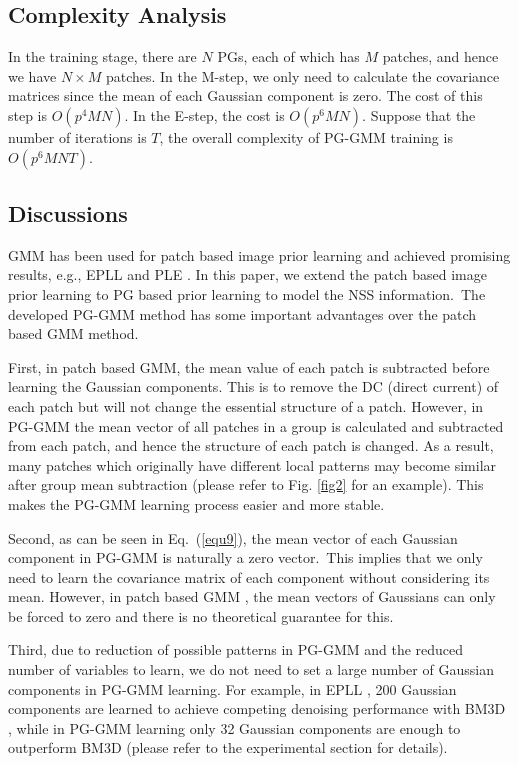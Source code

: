 \subsection{Complexity Analysis}
In the training stage, there are $N$ PGs, each of which has $M$ patches, and hence we have $N\times M$ patches. In the M-step, we only need to calculate the covariance matrices since the mean of each Gaussian component is zero. The cost of this step is $O(p^{4}MN)$. In the E-step, the cost is $O(p^{6}MN)$. Suppose that the number of iterations is $T$, the overall complexity of PG-GMM training is $O(p^{6}MNT)$.
\subsection{Discussions}
GMM has been used for patch based image prior learning and achieved promising results, e.g., EPLL \cite{epll} and PLE \cite{ple}. In this paper, we extend the patch based image prior learning to PG based prior learning to model the NSS information.\ The developed PG-GMM method has some important advantages over the patch based GMM method.

First, in patch based GMM, the mean value of each patch is subtracted before learning the Gaussian components. This is to remove the DC (direct current) of each patch but will not change the essential structure of a patch. However, in PG-GMM the mean vector of all patches in a group is calculated and subtracted from each patch, and hence the structure of each patch is changed. As a result, many patches which originally have different local patterns may become similar after group mean subtraction (please refer to Fig. \ref{fig2} for an example). This makes the PG-GMM learning process easier and more stable. 

Second, as can be seen in Eq.\ (\ref{equ9}), the mean vector of each Gaussian component in PG-GMM is naturally a zero vector.\ This implies that we only need to learn the covariance matrix of each component without considering its mean. However, in patch based GMM \cite{epll}, the mean vectors of Gaussians can only be forced to zero and there is no theoretical guarantee for this.

Third, due to reduction of possible patterns in PG-GMM and the reduced number of variables to learn, we do not need to set a large number of Gaussian components in PG-GMM learning. For example, in EPLL \cite{epll}, 200 Gaussian components are learned to achieve competing denoising performance with BM3D \cite{bm3d}, while in PG-GMM learning only 32 Gaussian components are enough to outperform BM3D (please refer to the experimental section for details).
\vspace{-0.2in}
